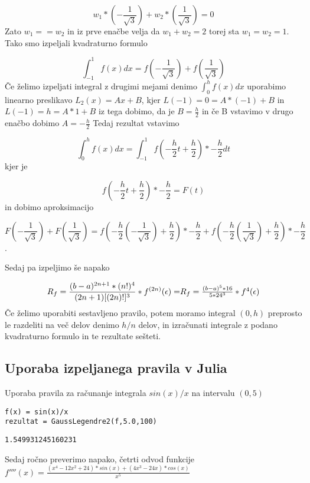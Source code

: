 \documentclass[12pt,a4paper]{article}
\begin{document}
\[
w_1*(-\frac{1}{\sqrt{3}}) + w_2*(\frac{1}{\sqrt{3}}) = 0
\]
Zato $w_1 == w_2$ in iz prve enačbe velja da $w_1 + w_2 = 2$ torej sta $w_1 = w_2 = 1$. Tako smo izpeljali kvadraturno formulo 

\[
\int_{-1}^1 f(x) dx = f(-\frac{1}{\sqrt{3}}) + f(\frac{1}{\sqrt{3}})
\]
Če želimo izpeljati integral z drugimi mejami denimo $\int_0^h f(x) dx$ uporabimo linearno preslikavo $L_2(x) = Ax + B$, kjer $L(-1) = 0 = A * (-1) + B$ in $L(-1) = h = A * 1 + B$ iz tega dobimo, da je $B = \frac{h}{2}$ in če B vstavimo  v drugo enačbo dobimo $A = -\frac{h}{2}$ Tedaj rezultat vstavimo 

\[
\int_0^h f(x) dx = \int_{-1}^1 f(-\frac{h}{2}t + \frac{h}{2}) * - \frac{h}{2}dt
\]
kjer je

\[
f(-\frac{h}{2}t + \frac{h}{2}) * - \frac{h}{2} = F(t)
\]
in dobimo aproksimacijo

\[
F(-\frac{1}{\sqrt{3}})+ F(\frac{1}{\sqrt{3}}) = f(-\frac{h}{2}(-\frac{1}{\sqrt{3}}) + \frac{h}{2}) * - \frac{h}{2} + f(-\frac{h}{2}(\frac{1}{\sqrt{3}}) + \frac{h}{2}) * - \frac{h}{2}
\]
.

Sedaj pa izpeljimo še napako 

\[
R_f = \frac{(b-a)^{2n+1} * (n!)^4}{(2n+1)[(2n)!]^3} * f^{(2n)}(\epsilon) = $$
$$R_f = \frac{(b-a)^5 * 16}{5*24^3} * f^{4}(\epsilon)
\]
Če želimo uporabiti sestavljeno pravilo, potem moramo integral $(0,h)$ preprosto le razdeliti na več delov denimo $h/n$ delov, in izračunati integrale z podano kvadraturno formulo in te rezultate sešteti.


\subsection{Uporaba izpeljanega pravila v Julia}

Uporaba pravila za računanje integrala $sin(x)/x$ na intervalu $(0,5)$


\begin{verbatim}
f(x) = sin(x)/x
rezultat = GaussLegendre2(f,5.0,100)
\end{verbatim}
\begin{verbatim}
1.549931245160231
\end{verbatim}

Sedaj ročno preverimo napako, četrti odvod funkcije $f''''(x) = \frac{(x^4 - 12x^2 + 24) * sin(x) + (4x^3 - 24x) * cos(x)}{x^5}$
\end{document}
